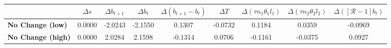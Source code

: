 \begin{tiny}\begin{tabular}{|l|c|c|c|c|c|c|c|c|}
\hline
&\textbf{$\Delta s$}&\textbf{$\Delta b_{t+1}$}&\textbf{$\Delta b_{t}$}&\textbf{$\Delta (b_{t+1}-b_t)$}&\textbf{$\Delta T$}&\textbf{$\Delta (\tau n_1\theta_1 l_1 )$}&\textbf{$\Delta (\tau n_2\theta_2 l_2)$}&\textbf{$\Delta ([\mathcal{R}-1]b_t)$}\\\hline
\textbf{No Change (low)}&0.0000&-2.0243&-2.1550&0.1307&-0.0732&0.1184&0.0359&-0.0969\\\hline
\textbf{No Change (high)}&0.0000&2.0284&2.1598&-0.1314&0.0706&-0.1161&-0.0375&0.0927\\\hline
\end{tabular}
\end{tiny}